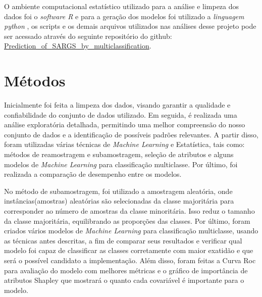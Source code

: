 \documentclass[12pt,oneside,a4paper,chapter=TITLE,
			   english,brazil]{abntex2}
\begin{document}

O ambiente computacional estatístico utilizado para a análise e limpeza dos dados foi o \textit{software R} \cite{R-Core-Team} e para a geração dos modelos foi utilizado a  \textit{linguagem python} \cite{python}, os scripts e os demais arquivos utilizados nas análises desse projeto pode ser acessado através do  seguinte repositório do github: \href{ https://github.com/JosefersonBarreto/Prediction_of_SARGS_by_multiclassification}{Prediction\_of\_SARGS\_by\_multiclassification}. 




\section{Métodos}

Inicialmente foi feita a  limpeza dos dados, visando garantir a qualidade e confiabilidade do conjunto de dados utilizado. Em seguida, é realizada uma análise exploratória detalhada, permitindo uma melhor compreensão do nosso conjunto de dados e a identificação de possíveis padrões relevantes. A partir disso, foram utilizadas várias técnicas de \textit{Machine Learning} e Estatística, tais como: métodos de reamostragem e subamostragem, seleção de atributos e alguns modelos de \textit{Machine Learning} para classificação multiclasse. Por último, foi realizada a comparação de desempenho entre os modelos.  

 No método de subamostragem, foi utilizado a amostragem aleatória, onde instâncias(amostras) aleatórias são selecionadas da classe majoritária para corresponder ao número de amostras da classe minoritária. Isso reduz o tamanho da classe majoritária, equilibrando as proporções das classes.  Por último, foram criados vários modelos de \textit{Machine Learning} para classificação multiclasse, usando as técnicas antes descritas, a fim de comparar seus resultados e verificar qual modelo  foi capaz de classificar as classes corretamente com maior exatidão e que será o possível candidato a implementação.  Além disso, foram feitas a Curva Roc para avaliação do modelo com melhores métricas   e  o gráfico de importância  de atributos Shapley que mostrará  o quanto cada covariável é importante para o modelo. 
 
\end{document}
